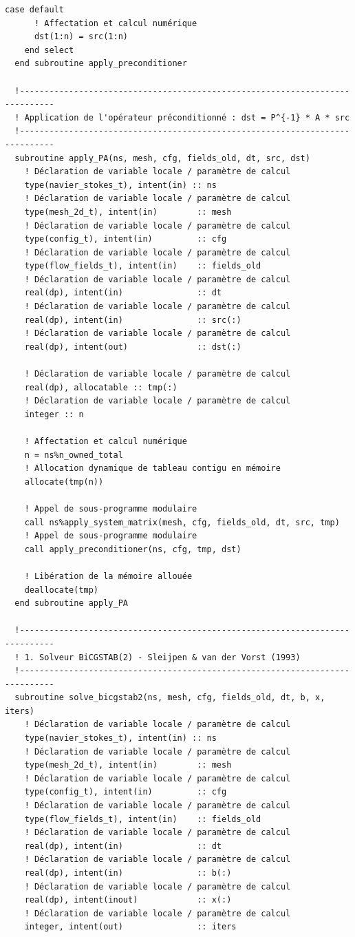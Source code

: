 \documentclass[10pt,a4paper,oneside]{book}
\begin{document}
\begin{lstlisting}[language={[95]Fortran}]
    case default
      ! Affectation et calcul numérique
      dst(1:n) = src(1:n)
    end select
  end subroutine apply_preconditioner

  !-----------------------------------------------------------------------------
  ! Application de l'opérateur préconditionné : dst = P^{-1} * A * src
  !-----------------------------------------------------------------------------
  subroutine apply_PA(ns, mesh, cfg, fields_old, dt, src, dst)
    ! Déclaration de variable locale / paramètre de calcul
    type(navier_stokes_t), intent(in) :: ns
    ! Déclaration de variable locale / paramètre de calcul
    type(mesh_2d_t), intent(in)        :: mesh
    ! Déclaration de variable locale / paramètre de calcul
    type(config_t), intent(in)         :: cfg
    ! Déclaration de variable locale / paramètre de calcul
    type(flow_fields_t), intent(in)    :: fields_old
    ! Déclaration de variable locale / paramètre de calcul
    real(dp), intent(in)               :: dt
    ! Déclaration de variable locale / paramètre de calcul
    real(dp), intent(in)               :: src(:)
    ! Déclaration de variable locale / paramètre de calcul
    real(dp), intent(out)              :: dst(:)

    ! Déclaration de variable locale / paramètre de calcul
    real(dp), allocatable :: tmp(:)
    ! Déclaration de variable locale / paramètre de calcul
    integer :: n

    ! Affectation et calcul numérique
    n = ns%n_owned_total
    ! Allocation dynamique de tableau contigu en mémoire
    allocate(tmp(n))

    ! Appel de sous-programme modulaire
    call ns%apply_system_matrix(mesh, cfg, fields_old, dt, src, tmp)
    ! Appel de sous-programme modulaire
    call apply_preconditioner(ns, cfg, tmp, dst)

    ! Libération de la mémoire allouée
    deallocate(tmp)
  end subroutine apply_PA

  !-----------------------------------------------------------------------------
  ! 1. Solveur BiCGSTAB(2) - Sleijpen & van der Vorst (1993)
  !-----------------------------------------------------------------------------
  subroutine solve_bicgstab2(ns, mesh, cfg, fields_old, dt, b, x, iters)
    ! Déclaration de variable locale / paramètre de calcul
    type(navier_stokes_t), intent(in) :: ns
    ! Déclaration de variable locale / paramètre de calcul
    type(mesh_2d_t), intent(in)        :: mesh
    ! Déclaration de variable locale / paramètre de calcul
    type(config_t), intent(in)         :: cfg
    ! Déclaration de variable locale / paramètre de calcul
    type(flow_fields_t), intent(in)    :: fields_old
    ! Déclaration de variable locale / paramètre de calcul
    real(dp), intent(in)               :: dt
    ! Déclaration de variable locale / paramètre de calcul
    real(dp), intent(in)               :: b(:)
    ! Déclaration de variable locale / paramètre de calcul
    real(dp), intent(inout)            :: x(:)
    ! Déclaration de variable locale / paramètre de calcul
    integer, intent(out)               :: iters


\end{lstlisting}
\end{document}
